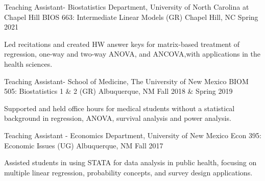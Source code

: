 \begin{cventries}
  \cventry
    {Teaching Assistant- Biostatistics Department, University of North Carolina at Chapel Hill} %
    {BIOS 663: Intermediate Linear Models (GR)} %
    {Chapel Hill, NC} %
    {Spring 2021} %
    {\begin{cvitems} %
    \item Led recitations and created HW answer keys for matrix-based treatment of regression, one-way and two-way ANOVA, and ANCOVA,\newline with applications in the health sciences.
    \end{cvitems}
    }
    
  \cventry
    {Teaching Assistant- School of Medicine, The University of New Mexico } %
    {BIOM 505: Biostatistics 1 \& 2 (GR)} %
    {Albuquerque, NM} %
    {Fall 2018 \& Spring 2019} %
    {\begin{cvitems} %
    \item Supported and held office hours for medical students without a statistical background in regression, \newline ANOVA, survival analysis  and power analysis.
    \end{cvitems}
    }
    
  \cventry
    {Teaching Assistant - Economics Department, University of New Mexico} %
    {Econ 395: Economic Issues (UG)} %
    {Albuquerque, NM} %
    {Fall 2017} %
    {\begin{cvitems} %
\item Assisted students in using STATA for data analysis in public health, focusing on multiple linear regression, \newline probability concepts, and survey design applications.
    \end{cvitems}
    }



\end{cventries}

